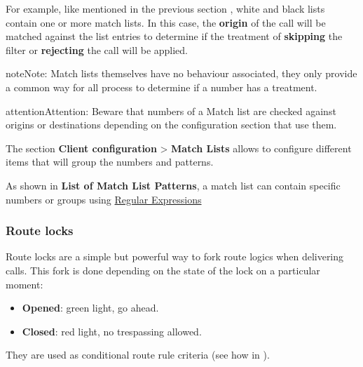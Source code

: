 \documentclass[letterpaper,10pt,english]{sphinxmanual}
\begin{document}
For example, like mentioned in the previous section {\hyperref[administration_portal/client/vpbx/routing_tools/external_call_filters:external\string-filters]{}},
white and black lists contain one or more match lists. In this case, the
\textbf{origin} of the call will be matched against the list entries to determine if
the treatment of \textbf{skipping} the filter or \textbf{rejecting} the call will be applied.

\begin{notice}{note}{Note:}
Match lists themselves have no behaviour associated, they only provide
a common way for all process to determine if a number has a treatment.
\end{notice}

\begin{notice}{attention}{Attention:}
Beware that numbers of a Match list are checked against origins
or destinations depending on the configuration section that use them.
\end{notice}

The section \textbf{Client configuration} \textgreater{} \textbf{Match Lists} allows to configure
different items that will group the numbers and patterns.

As shown in \textbf{List of Match List Patterns}, a match list can contain specific numbers or groups using
\href{http://php.net/manual/en/reference.pcre.pattern.syntax.php}{Regular Expressions}


\subsubsection{Route locks}
\label{administration_portal/client/vpbx/routing_tools/route_locks:id1}\label{administration_portal/client/vpbx/routing_tools/route_locks::doc}\label{administration_portal/client/vpbx/routing_tools/route_locks:route-locks}
Route locks are a simple but powerful way to fork route logics when delivering calls. This fork is done depending on the
state of the lock on a particular moment:
\begin{itemize}
\item {} 
\textbf{Opened}: green light, go ahead.

\item {} 
\textbf{Closed}: red light, no trespassing allowed.

\end{itemize}

They are used as conditional route rule criteria (see how in {\hyperref[administration_portal/client/vpbx/routing_endpoints/conditional_routes:conditional\string-routes]{}}).
\end{document}

